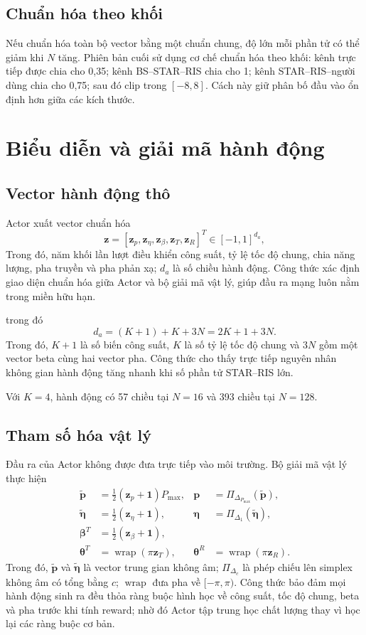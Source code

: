 \subsection{Chuẩn hóa theo khối}
Nếu chuẩn hóa toàn bộ vector bằng một chuẩn chung, độ lớn mỗi phần tử có thể giảm khi $N$ tăng. Phiên bản cuối sử dụng cơ chế chuẩn hóa theo khối: kênh trực tiếp được chia cho 0,35; kênh BS--STAR--RIS chia cho 1; kênh STAR--RIS--người dùng chia cho 0,75; sau đó clip trong $[-8,8]$. Cách này giữ phân bố đầu vào ổn định hơn giữa các kích thước.

\section{Biểu diễn và giải mã hành động}
\subsection{Vector hành động thô}
Actor xuất vector chuẩn hóa
\begin{equation}
 \bm z=[\bm z_p,\bm z_{\eta},\bm z_{\beta},\bm z_T,\bm z_R]^T
 \in[-1,1]^{d_a},
\end{equation}
Trong đó, năm khối lần lượt điều khiển công suất, tỷ lệ tốc độ chung, chia năng lượng, pha truyền và pha phản xạ; $d_a$ là số chiều hành động. Công thức xác định giao diện chuẩn hóa giữa Actor và bộ giải mã vật lý, giúp đầu ra mạng luôn nằm trong miền hữu hạn.

trong đó
\begin{equation}
 d_a=(K+1)+K+3N=2K+1+3N.
 \label{eq:action-dimension-ch3}
\end{equation}
Trong đó, $K+1$ là số biến công suất, $K$ là số tỷ lệ tốc độ chung và $3N$ gồm một vector beta cùng hai vector pha. Công thức cho thấy trực tiếp nguyên nhân không gian hành động tăng nhanh khi số phần tử STAR--RIS lớn.

Với $K=4$, hành động có 57 chiều tại $N=16$ và 393 chiều tại $N=128$.

\subsection{Tham số hóa vật lý}
Đầu ra của Actor không được đưa trực tiếp vào môi trường. Bộ giải mã vật lý thực hiện
\begin{align}
 \widetilde{\bm p}&=\tfrac12(\bm z_p+\mathbf{1})P_{\max},
 &\bm p&=\Pi_{\Delta_{P_{\max}}}(\widetilde{\bm p}),\\
 \widetilde{\bm\eta}&=\tfrac12(\bm z_{\eta}+\mathbf{1}),
 &\bm\eta&=\Pi_{\Delta_1}(\widetilde{\bm\eta}),\\
 \bm\beta^T&=\tfrac12(\bm z_{\beta}+\mathbf{1}),\\
 \bm\theta^T&=\operatorname{wrap}(\pi\bm z_T),
 &\bm\theta^R&=\operatorname{wrap}(\pi\bm z_R).
 \label{eq:action-decoder-ch3}
\end{align}
Trong đó, $\widetilde{\bm p}$ và $\widetilde{\bm\eta}$ là vector trung gian không âm; $\Pi_{\Delta_c}$ là phép chiếu lên simplex không âm có tổng bằng $c$; $\operatorname{wrap}$ đưa pha về $[-\pi,\pi)$. Công thức bảo đảm mọi hành động sinh ra đều thỏa ràng buộc hình học về công suất, tốc độ chung, beta và pha trước khi tính reward; nhờ đó Actor tập trung học chất lượng thay vì học lại các ràng buộc cơ bản.

